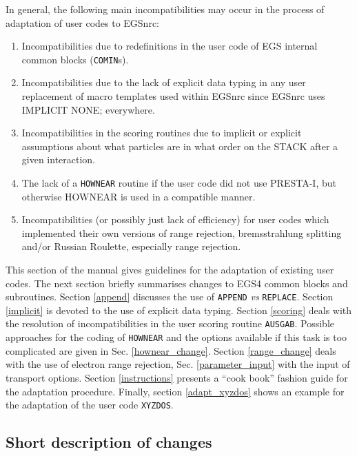 In general, the following main incompatibilities may occur
in the process of adaptation of user codes to EGSnrc:

\begin{enumerate}

\item
Incompatibilities due to redefinitions in the user code of EGS internal
common blocks (\verb+COMIN+s).

\item
Incompatibilities due to the lack of explicit data typing in any user
replacement of macro templates used within EGSnrc since EGSnrc uses
IMPLICIT NONE; everywhere.

\item
Incompatibilities in the scoring routines due to implicit or explicit
assumptions about what particles are in what order on the STACK after a
given interaction.

\item The lack of a {\tt HOWNEAR} routine if the user code did not use
PRESTA-I, but otherwise HOWNEAR is used in a compatible manner.

\item
Incompatibilities (or possibly just lack of efficiency) for user codes
which implemented their own versions of range rejection, bremsstrahlung
splitting and/or Russian Roulette, especially range rejection.
\end{enumerate}

This section of the manual gives guidelines for the adaptation
of existing user codes. The next section
briefly summarises changes to EGS4 common blocks and
subroutines. Section \ref{append} discusses the use of
{\tt APPEND} {\em vs} {\tt REPLACE}. Section
\ref{implicit} is devoted to the use of explicit data typing.
Section \ref{scoring} deals with the resolution of
incompatibilities in the user scoring routine
{\tt AUSGAB}. Possible approaches for the
coding of {\tt HOWNEAR} and the options available
if this task is too complicated are given in Sec. \ref{hownear_change}.
Section \ref{range_change} deals with the use of electron range rejection,
Sec. \ref{parameter_input} with the input of transport options.
Section \ref{instructions} presents a ``cook book'' fashion guide
for the adaptation procedure. Finally, section
\ref{adapt_xyzdos} shows an example for the adaptation of the user
code {\tt XYZDOS}.

\subsection{Short description of changes}
\label{changes}

